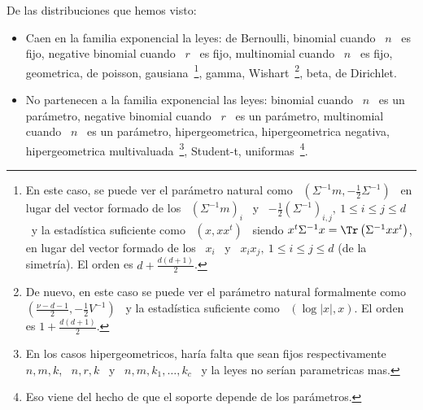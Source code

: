 De las distribuciones que hemos visto:
%
\begin{itemize}
\item Caen en  la familia exponencial la leyes: de  Bernoulli, binomial cuando \
  $n$ \ es fijo, negative binomial cuando  \ $r$ \ es fijo, multinomial cuando \
  $n$ \  es fijo,  geometrica, de poisson,  gausiana~\footnote{En este  caso, se
    puede ver  el par\'ametro  natural como \  $\left( \Sigma^{-1} m  , -\frac12
      \Sigma^{-1}  \right)$ \  en  lugar del  vector  formado de  los \  $\left(
      \Sigma^{-1} m \right)_i$ \ y \ $-\frac12 \left( \Sigma^{-1} \right)_{i,j},
    \: 1 \le i \le j \le d$ \ y la estad\'istica suficiente como \ $\left( x , x
      x^t \right)$  \ siendo  $x^t \Sigma^{-1} x  = \Tr\left( \Sigma^{-1}  x x^t
    \right)$, en lugar  del vector formado de los  \ $x_i$ \ y \ $x_i  x_j, \: 1
    \le  i  \le  j \le  d$  (de  la  simetr\'ia).   El  orden es  $d  +  \frac{d
      (d+1)}{2}$.}, gamma, Wishart~\footnote{De nuevo, en este caso se puede ver
    el  par\'ametro  natural  formalmente  como \  $\left(  \frac{\nu-d-1}{2}  ,
      -\frac12 V^{-1}  \right)$ \ y  la estad\'istica suficiente como  \ $\left(
      \log |x|  , x \right)$.  El orden es  $1 + \frac{d (d+1)}{2}$.},  beta, de
  Dirichlet.
%
%
\item No partenecen a la familia  exponencial las leyes: binomial cuando \ $n$ \
  es  un  par\'ametro, negative  binomial  cuando \  $r$  \  es un  par\'ametro,
  multinomial cuando \ $n$ \ es un par\'ametro, hipergeometrica, hipergeometrica
  negativa,     hipergeometrica      multivaluada~\footnote{En     los     casos
    hipergeometricos, har\'ia falta que sean  fijos respectivamente \ $n, m, k$,
    \ $n,  r, k$  \ y  \ $n,  m, k_1, \ldots  , k_c$  \ y  la leyes  no ser\'ian
    parametricas  mas.}, Student-t, uniformas~\footnote{Eso  viene del  hecho de
    que el soporte depende de los par\'ametros.}.
\end{itemize}

